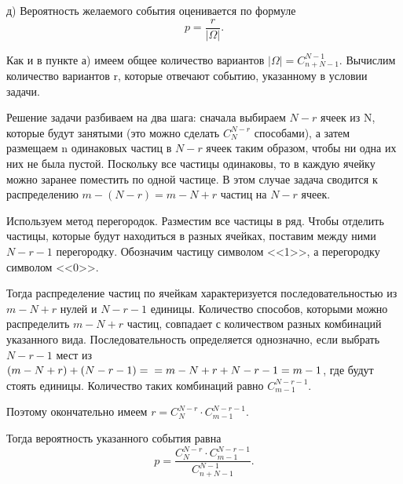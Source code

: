 \documentclass{book}
\begin{document}
д) Вероятность желаемого события оценивается по формуле
$$ p =
\frac{r}{| \Omega |}.$$

Как и в пункте а) имеем общее количество вариантов $ | \Omega | = C_{n+N-1}^{N-1} $.
Вычислим количество вариантов r, которые отвечают событию, указанному в условии задачи.

Решение задачи разбиваем на два шага:
сначала выбираем $ N - r $ ячеек из N, которые будут занятыми (это можно сделать $ C_{N}^{N-r} $ способами),
а затем размещаем n одинаковых частиц в $ N - r $ ячеек таким образом, чтобы ни одна их них не была пустой.
Поскольку все частицы одинаковы, то в каждую ячейку можно заранее поместить по одной частице.
В этом случае задача сводится к распределению $ m - \left( N - r \right) = m - N + r $ частиц на $ N - r $ ячеек.

Используем метод перегородок.
Разместим все частицы в ряд.
Чтобы отделить частицы, которые будут находиться в разных ячейках, поставим между ними $ N - r - 1 $ перегородку.
Обозначим частицу символом <<1>>, а перегородку символом <<0>>.

Тогда распределение частиц по ячейкам характеризуется последовательностью из $ m - N + r $ нулей и $ N - r - 1 $ единицы.
Количество способов, которыми можно распределить $ m - N + r $ частиц, совпадает с количеством разных комбинаций указанного вида.
Последовательность определяется однозначно, если выбрать $ N - r - 1 $ мест из
$ \left( m - N + r \right) + \left( N - r - 1 \right) = \\
= m - N + r + N - r - 1 = m - 1 $,
где будут стоять единицы.
Количество таких комбинаций равно $ C_{m-1}^{N - r - 1} $.

Поэтому окончательно имеем $ r = C_{N}^{N-r} \cdot C_{m-1}^{N - r - 1} $.

Тогда вероятность указанного события равна
$$ p =
\frac{C_{N}^{N-r} \cdot C_{m-1}^{N - r - 1}}{C_{n+N-1}^{N-1}}.$$
\end{document}
